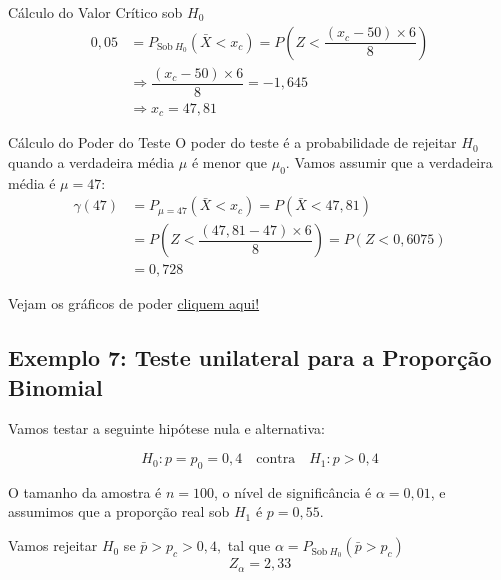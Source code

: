 \documentclass[12pt]{beamer}
\begin{document}
\begin{frame}{}
	\begin{block}{Cálculo do Valor Crítico sob $H_{0}$}
		\justifying
		\begin{align*}
			0,05&=P_{\text{Sob}~H_{0}}(\bar{X}<x_{c})=P(Z<\dfrac{(x_{c}-50)\times6}{8})\\
			&\Rightarrow \dfrac{(x_{c}-50)\times6}{8}=-1,645\\
			&\Rightarrow x_{c}=47,81
		\end{align*}
	\end{block}
	\pause
	\begin{block}{Cálculo do Poder do Teste}
		\justifying
		O poder do teste é a probabilidade de rejeitar $H_0$ quando a verdadeira média $\mu$ é menor que $\mu_0$. Vamos assumir que a verdadeira média é $\mu = 47:$
		\begin{align*}
			\gamma(47)&=P_{\mu=47}(\bar{X}<x_{c})=P(\bar{X}<47,81)\\
			&=P(Z<\dfrac{(47,81-47)\times6}{8})=P(Z<0,6075)\\
			&=0,728
		\end{align*}
	\end{block}
\end{frame}

\begin{frame}{}
	\begin{block}{}
		Vejam os gráficos de poder \href{https://est711.shinyapps.io/FuncaoPoder/}{cliquem aqui!}
	\end{block}
\end{frame}

\subsection{Exemplo 7: Teste unilateral para a Proporção Binomial}
\begin{frame}{}
	\begin{block}{}
		\justifying
		Vamos testar a seguinte hipótese nula e alternativa:
		
		\[
		H_0: p = p_0 = 0,4 \quad \text{contra} \quad H_1: p > 0,4
		\]
		
		O tamanho da amostra é \(n = 100\), o nível de significância é \(\alpha = 0,01\), e assumimos que a proporção real sob \(H_1\) é \(p = 0,55\).
	\end{block}
	\pause
	\begin{block}{}
		\justifying
		Vamos rejeitar $H_0$ se $\bar{p}>p_{c}>0,4,$ tal que $\alpha=P_{\text{Sob}~H_{0}}(\bar{p}>p_{c})$
		\[
		Z_{\alpha} = 2,33
		\]	
	\end{block}
\end{frame}
\end{document}
